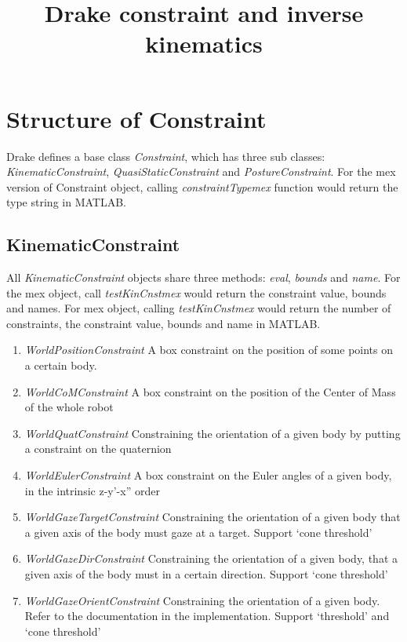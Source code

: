 \documentclass{article}
\title{Drake constraint and inverse kinematics}
\begin{document}
\maketitle
\section{Structure of Constraint}
Drake defines a base class \textsl{Constraint}, which has three sub classes: \textsl{KinematicConstraint}, \textsl{QuasiStaticConstraint} and \textsl{PostureConstraint}. For the mex version of Constraint object, calling \textsl{constraintTypemex} function would return the type string in MATLAB. 

\subsection{KinematicConstraint}
All \textsl{KinematicConstraint} objects share three methods: \textsl{eval}, \textsl{bounds} and \textsl{name}. For the mex object, call \textsl{testKinCnstmex} would return the constraint value, bounds and names. For mex object, calling \textsl{testKinCnstmex} would return the number of constraints, the constraint value, bounds and name in MATLAB.
\begin{enumerate}
\item \textsl{WorldPositionConstraint} A box constraint on the position of some points on a certain body.
\item \textsl{WorldCoMConstraint} A box constraint on the position of the Center of Mass of the whole robot
\item \textsl{WorldQuatConstraint} Constraining the orientation of a given body by putting a constraint on the quaternion
\item \textsl{WorldEulerConstraint} A box constraint on the Euler angles of a given body, in the intrinsic z-y'-x'' order
\item \textsl{WorldGazeTargetConstraint} Constraining the orientation of a given body that a given axis of the body must gaze at a target. Support `cone threshold'
\item \textsl{WorldGazeDirConstraint} Constraining the orientation of a given body, that a given axis of the body must in a certain direction. Support `cone threshold'
\item \textsl{WorldGazeOrientConstraint} Constraining the orientation of a given body. Refer to the documentation in the implementation. Support `threshold' and `cone threshold'
\end{enumerate}
\end{document}
